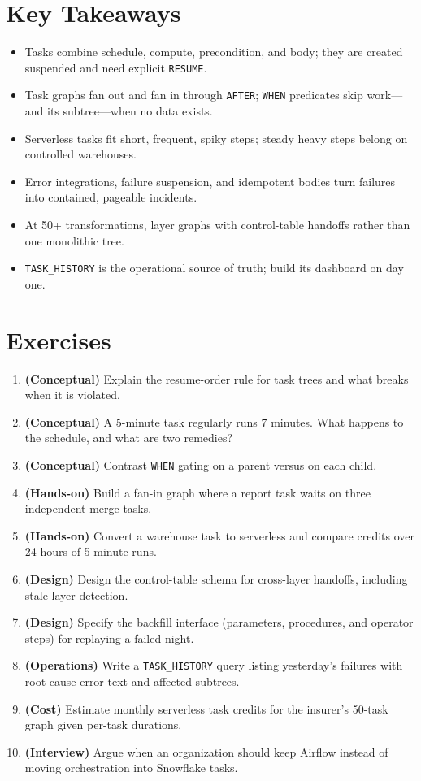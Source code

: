 \section*{Key Takeaways}
\begin{itemize}
    \item Tasks combine schedule, compute, precondition, and body; they are created suspended and need explicit \texttt{RESUME}.
    \item Task graphs fan out and fan in through \texttt{AFTER}; \texttt{WHEN} predicates skip work---and its subtree---when no data exists.
    \item Serverless tasks fit short, frequent, spiky steps; steady heavy steps belong on controlled warehouses.
    \item Error integrations, failure suspension, and idempotent bodies turn failures into contained, pageable incidents.
    \item At 50+ transformations, layer graphs with control-table handoffs rather than one monolithic tree.
    \item \texttt{TASK\_HISTORY} is the operational source of truth; build its dashboard on day one.
\end{itemize}

\section{Exercises}
\begin{enumerate}
    \item \textbf{(Conceptual)} Explain the resume-order rule for task trees and what breaks when it is violated.
    \item \textbf{(Conceptual)} A 5-minute task regularly runs 7 minutes. What happens to the schedule, and what are two remedies?
    \item \textbf{(Conceptual)} Contrast \texttt{WHEN} gating on a parent versus on each child.
    \item \textbf{(Hands-on)} Build a fan-in graph where a report task waits on three independent merge tasks.
    \item \textbf{(Hands-on)} Convert a warehouse task to serverless and compare credits over 24 hours of 5-minute runs.
    \item \textbf{(Design)} Design the control-table schema for cross-layer handoffs, including stale-layer detection.
    \item \textbf{(Design)} Specify the backfill interface (parameters, procedures, and operator steps) for replaying a failed night.
    \item \textbf{(Operations)} Write a \texttt{TASK\_HISTORY} query listing yesterday's failures with root-cause error text and affected subtrees.
    \item \textbf{(Cost)} Estimate monthly serverless task credits for the insurer's 50-task graph given per-task durations.
    \item \textbf{(Interview)} Argue when an organization should keep Airflow instead of moving orchestration into Snowflake tasks.
\end{enumerate}

